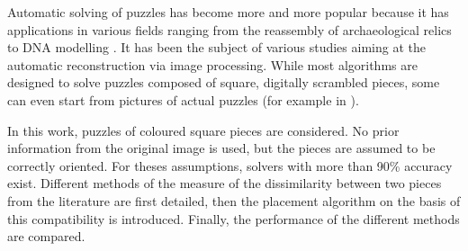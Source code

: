 Automatic solving of puzzles has become more and more popular because it has applications in various fields ranging from the reassembly of archaeological relics to DNA modelling \cite{robust}. It has been the subject of various studies aiming at the automatic reconstruction via image processing. While most algorithms are designed to solve puzzles composed of square, digitally scrambled pieces, some can even start from pictures of actual puzzles (for example in \cite{shape}). 

In this work, puzzles of coloured square pieces are considered. No prior information from the original image is used, but the pieces are assumed to be correctly oriented. For theses assumptions, solvers with more than 90\% accuracy exist. Different methods of the measure of the dissimilarity between two pieces from the literature are first detailed, then the placement algorithm on the basis of this compatibility is introduced. Finally, the performance of the different methods are compared.